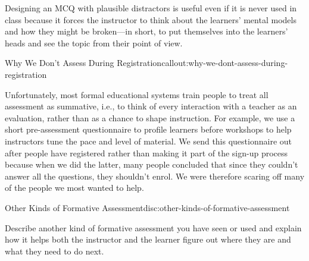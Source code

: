 Designing an MCQ with plausible distractors is useful even if it is
never used in class because it forces the instructor to think about the
learners' mental models and how they might be broken---in short, to put
themselves into the learners' heads and see the topic from their point
of view.

\begin{callout}{Why We Don't Assess During Registration}{callout:why-we-dont-assess-during-registration}

Unfortunately, most formal educational systems train people to treat all
assessment as summative, i.e., to think of every interaction with a
teacher as an evaluation, rather than as a chance to shape instruction.
For example, we use a short pre-assessment questionnaire to profile
learners before workshops to help instructors tune the pace and level of
material. We send this questionnaire out after people have registered
rather than making it part of the sign-up process because when we did
the latter, many people concluded that since they couldn't answer all
the questions, they shouldn't enrol. We were therefore scaring off many
of the people we most wanted to help.
\end{callout}

\begin{discussion}{Other Kinds of Formative Assessment}{disc:other-kinds-of-formative-assessment}

Describe another kind of formative assessment you have seen or used and
explain how it helps both the instructor and the learner figure out
where they are and what they need to do next.
\end{discussion}
